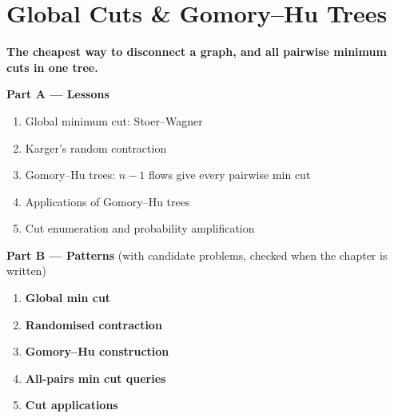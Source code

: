 \chapter{Global Cuts \& Gomory--Hu Trees}
\label{ch:global_cuts}

\begin{tcolorbox}[enhanced, colback=white, colframe=secondaryblue, boxrule=1pt, arc=2mm]
\textbf{\large\textcolor{primaryblue}{The cheapest way to disconnect a graph, and all pairwise minimum cuts in one tree.}}
\end{tcolorbox}


\begin{plannedbox}
\textbf{Part A --- Lessons}
\begin{enumerate}[leftmargin=*, label=\textbf{A\arabic*.}, itemsep=1pt]
    \item Global minimum cut: Stoer--Wagner
    \item Karger's random contraction
    \item Gomory--Hu trees: $n-1$ flows give every pairwise min cut
    \item Applications of Gomory--Hu trees
    \item Cut enumeration and probability amplification
\end{enumerate}
\textbf{Part B --- Patterns} (with candidate problems, checked when the chapter is written)
\begin{enumerate}[leftmargin=*, label=\textbf{P\arabic*.}, itemsep=1pt]
    \item \textbf{Global min cut}
    \item \textbf{Randomised contraction}
    \item \textbf{Gomory--Hu construction}
    \item \textbf{All-pairs min cut queries}
    \item \textbf{Cut applications}
\end{enumerate}
\end{plannedbox}
